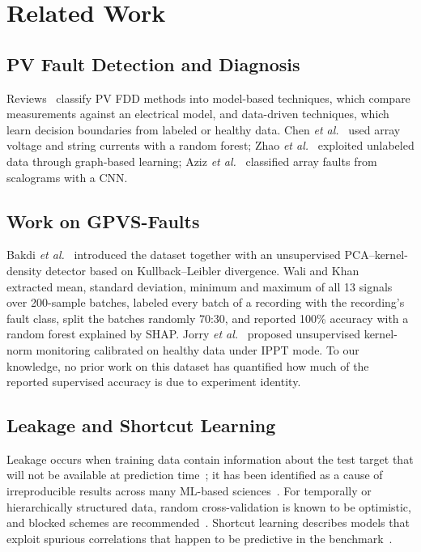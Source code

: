 \documentclass[conference]{IEEEtran}
\begin{document}
\section{Related Work}
\subsection{PV Fault Detection and Diagnosis}
Reviews~\cite{mellit2018review,pillai2018review,madeti2017faults} classify PV FDD methods into model-based techniques, which compare measurements against an electrical model, and data-driven techniques, which learn decision boundaries from labeled or healthy data. Chen \emph{et al.}~\cite{chen2018rf} used array voltage and string currents with a random forest; Zhao \emph{et al.}~\cite{zhao2015graph} exploited unlabeled data through graph-based learning; Aziz \emph{et al.}~\cite{aziz2020cnn} classified array faults from scalograms with a CNN.

\subsection{Work on GPVS-Faults}
Bakdi \emph{et al.}~\cite{bakdi2021realtime} introduced the dataset together with an unsupervised PCA--kernel-density detector based on Kullback--Leibler divergence. Wali and Khan~\cite{wali2021explainable} extracted mean, standard deviation, minimum and maximum of all 13 signals over 200-sample batches, labeled every batch of a recording with the recording's fault class, split the batches randomly 70:30, and reported 100\% accuracy with a random forest explained by SHAP. Jorry \emph{et al.}~\cite{jorry2026kernel} proposed unsupervised kernel-norm monitoring calibrated on healthy data under IPPT mode. To our knowledge, no prior work on this dataset has quantified how much of the reported supervised accuracy is due to experiment identity.

\subsection{Leakage and Shortcut Learning}
Leakage occurs when training data contain information about the test target that will not be available at prediction time~\cite{kaufman2012leakage}; it has been identified as a cause of irreproducible results across many ML-based sciences~\cite{kapoor2023leakage}. For temporally or hierarchically structured data, random cross-validation is known to be optimistic, and blocked schemes are recommended~\cite{roberts2017cv,bergmeir2012cv}. Shortcut learning describes models that exploit spurious correlations that happen to be predictive in the benchmark~\cite{geirhos2020shortcut}.
\end{document}
